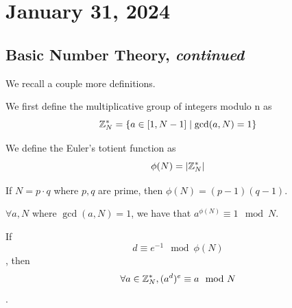\section{January 31, 2024}
\label{20240131}

\subsection{Basic Number Theory, \emph{continued}}

We recall a couple more definitions.

\begin{definition}
    We first define the multiplicative group of integers modulo n as
    $$\mathbb Z_N^* = \{a\in [1, N-1]\mid \gcd(a, N) = 1\}$$
\end{definition}

\begin{definition}
    We define the Euler's totient function as
    $$\phi(N) = |\mathbb Z_N^*|$$
\end{definition}

\begin{example}
    If $N = p \cdot q$ where $p, q$ are prime, then $\phi(N) = (p-1)(q-1)$.
\end{example}

\begin{theorem}
    $\forall a, N$ where $\gcd(a, N) = 1$, we have that $a^{\phi(N)} \equiv 1 \mod N$.
\end{theorem}

\begin{corollary}
    If $$d \equiv e^{-1} \mod \phi(N)$$, then $$\forall a \in \mathbb Z_N^*, (a^d)^e \equiv a \mod N$$.
\end{corollary}



